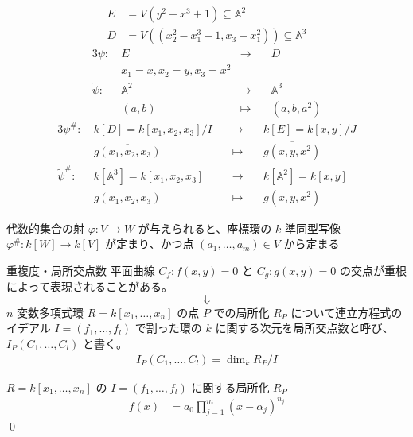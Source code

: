 \documentclass[uplatex,dvipdfmx,a4paper,11pt]{jlreq}
\makeatletter
\renewcommand{\AA}{\mathbb{A}}
\numberwithin{equation}{section}
\theoremstyle{definition}
\renewenvironment{proof}[1][\proofname]{\par
  \normalfont
  \topsep6\p@\@plus6\p@ \trivlist
  \item[\hskip\labelsep{\bfseries #1}\@addpunct{\bfseries}]\ignorespaces\quad\par
}{%
  \qed\endtrivlist\@endpefalse
}
\renewcommand\proofname{証明}
\makeatother
\begin{document}
\begin{example}
  \begin{align}
    E & = V(y^2 - x^3 + 1) \subseteq \AA^2                    \\
    D & = V((x_2^2 - x_1^3 + 1, x_3 - x_1^2)) \subseteq \AA^3
  \end{align}
  \begin{alignat}{3}
    \psi: \        & E \quad                     & \to\quad     & D           \\
                   & x_1 = x, x_2 = y, x_3 = x^2                              \\
    \tilde\psi: \  & \AA^2 \quad                 & \to\quad     & \AA^3       \\
                   & (a, b) \quad                & \mapsto\quad & (a, b, a^2)
  \end{alignat}
  \begin{alignat}{3}
    \psi^\#: \        & k[D] = k[x_1,x_2,x_3]/I \quad   & \to\quad     & k[E] = k[x,y]/J       \\
                      & \overline{g(x_1,x_2,x_3)} \quad & \mapsto\quad & \overline{g(x,y,x^2)} \\
    \tilde\psi^\#: \  & k[\AA^3] = k[x_1,x_2,x_3] \quad & \to\quad     & k[\AA^2] = k[x,y]     \\
                      & g(x_1,x_2,x_3) \quad            & \mapsto\quad & g(x,y,x^2)
  \end{alignat}
\end{example}

\begin{proposition}
  代数的集合の射 $\varphi: V\to W$ が与えられると、座標環の $k$ 準同型写像 $\varphi^\#: k[W]\to k[V]$ が定まり、かつ点 $(a_1,\ldots,a_m)\in V$ から定まる
\end{proposition}

\begin{itembox}[l]{重複度・局所交点数}
  平面曲線 $C_f: f(x, y) = 0$ と $C_g: g(x, y) = 0$ の交点が重根によって表現されることがある。
  \begin{equation*}
    \Downarrow
  \end{equation*}
  $n$ 変数多項式環 $R = k[x_1,\ldots,x_n]$ の点 $P$ での局所化 $R_P$ について連立方程式のイデアル $I = (f_1,\ldots,f_l)$ で割った環の $k$ に関する次元を局所交点数と呼び、$I_P(C_1,\ldots,C_l)$ と書く。
  \begin{align}
    I_P(C_1,\ldots,C_l) = \dim_k R_P/I
  \end{align}
\end{itembox}
\begin{proof}
  $R = k[x_1,\ldots,x_n]$ の $I = (f_1,\ldots,f_l)$ に関する局所化 $R_P$
  \begin{align}
    f(x) & = a_0\prod_{j=1}^{m}(x - \alpha_j)^{n_j}
  \end{align}
\end{proof}
\begin{example}

\end{example}
\end{document}
